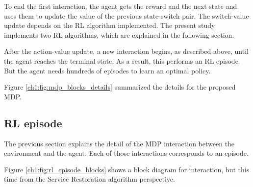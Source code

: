 To end the first interaction, the agent gets the reward and the next state and uses them 
to update the value of the previous state-switch pair. The switch-value update depends on 
the RL algorithm implemented. The present study implements two  RL algorithms, which are 
explained in the following section. 

After the action-value update, a new interaction begins, as described above, until the agent 
reaches the terminal state.  As a result, this performs an RL episode. But the agent needs 
hundreds of episodes to learn an optimal policy. 

Figure \ref{ch1:fig:mdp_blocks_details} summarized the details for the proposed MDP.



\subsection{RL episode}


The previous section explains the detail of the MDP interaction between the environment and the agent. Each of those interactions corresponds to an episode. 

Figure \ref{ch1:fig:rl_episode_blocks} shows a block diagram for interaction, but this time from the Service Restoration algorithm perspective. 






